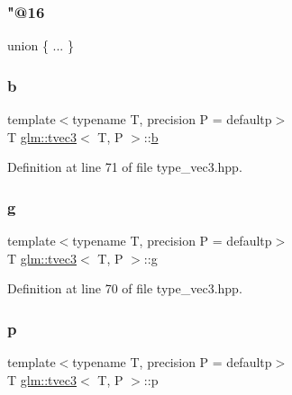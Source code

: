 \mbox{\label{structglm_1_1tvec3_ae5badeef3483eb3cfbeda0ec8b26baa1}} 
\subsubsection{\texorpdfstring{"@16}{@16}}
{\footnotesize\ttfamily union \{ ... \} }

\mbox{\label{structglm_1_1tvec3_a570fe745d201dd6f0e700c36e3f18a77}} 
\subsubsection{\texorpdfstring{b}{b}}
{\footnotesize\ttfamily template$<$typename T, precision P = defaultp$>$ \\
T \mbox{\hyperlink{structglm_1_1tvec3}{glm\+::tvec3}}$<$ T, P $>$\+::\mbox{\hyperlink{glad_8h_a6eba317e3cf44d6d26c04a5a8f197dcb}{b}}}



Definition at line 71 of file type\+\_\+vec3.\+hpp.

\mbox{\label{structglm_1_1tvec3_a1ed9dc6682a6d36221feb544337e60e3}} 
\subsubsection{\texorpdfstring{g}{g}}
{\footnotesize\ttfamily template$<$typename T, precision P = defaultp$>$ \\
T \mbox{\hyperlink{structglm_1_1tvec3}{glm\+::tvec3}}$<$ T, P $>$\+::\mbox{\hyperlink{glad_8h_a9cd653b1648845554169fbc3a3f6d37a}{g}}}



Definition at line 70 of file type\+\_\+vec3.\+hpp.

\mbox{\label{structglm_1_1tvec3_a417136ea49cbecf1d92697b283e1a25f}} 
\subsubsection{\texorpdfstring{p}{p}}
{\footnotesize\ttfamily template$<$typename T, precision P = defaultp$>$ \\
T \mbox{\hyperlink{structglm_1_1tvec3}{glm\+::tvec3}}$<$ T, P $>$\+::p}



